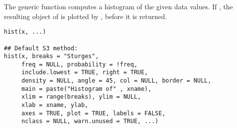 %
\begin{Description}\relax
The generic function  computes a histogram of the given
data values.  If , the resulting object of
  is plotted by
, before it is returned.
\end{Description}
%
\begin{Usage}
\begin{verbatim}
hist(x, ...)

## Default S3 method:
hist(x, breaks = "Sturges",
     freq = NULL, probability = !freq,
     include.lowest = TRUE, right = TRUE,
     density = NULL, angle = 45, col = NULL, border = NULL,
     main = paste("Histogram of" , xname),
     xlim = range(breaks), ylim = NULL,
     xlab = xname, ylab,
     axes = TRUE, plot = TRUE, labels = FALSE,
     nclass = NULL, warn.unused = TRUE, ...)
\end{verbatim}
\end{Usage}
%
